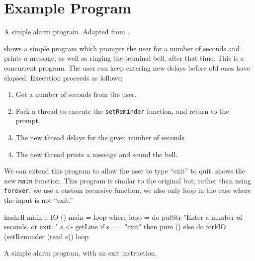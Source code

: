 \section{Example Program}
\label{sec:concurrent_haskell-example}

\begin{listing}
\centering
{}
\caption[A simple alarm program.]{A simple alarm program.  Adapted from \cite{marlow2013}.}\label{lst:ch_ex1}
\end{listing}

 shows a simple program which prompts the user for a
number of seconds and prints a message, as well as ringing the
terminal bell, after that time.  This is a concurrent program.  The
user can keep entering new delays before old ones have elapsed.
Execution proceeds as follows:

\begin{enumerate}
\item Get a number of seconds from the user.
\item Fork a thread to execute the \verb|setReminder| function, and
  return to the prompt.
\item The new thread delays for the given number of seconds.
\item The new thread prints a message and sound the bell.
\end{enumerate}

We can extend this program to allow the user to type ``exit'' to quit.
 shows the new \verb|main| function.  This program is
similar to the original but, rather than using \verb|forever|, we use
a custom recursive function; we also only loop in the case where the
input is not ``exit.''

\begin{listing}
\centering
\begin{cminted}{haskell}
main :: IO ()
main = loop where
  loop = do
    putStr "Enter a number of seconds, or \"exit\": "
    s <- getLine
    if s == "exit"
      then pure ()
      else do
        forkIO (setReminder (read s))
        loop
\end{cminted}
\caption{A simple alarm program, with an exit instruction.}\label{lst:ch_ex2}
\end{listing}

